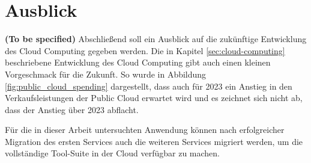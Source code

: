 \chapter{Ausblick}
\textbf{(To be specified)}
Abschließend soll ein Ausblick auf die zukünftige Entwicklung des Cloud Computing gegeben werden. Die in Kapitel \ref{sec:cloud-computing} beschriebene Entwicklung des Cloud Computing gibt auch einen kleinen Vorgeschmack für die Zukunft. So wurde in Abbildung \ref{fig:public_cloud_spending} dargestellt, dass auch für 2023 ein Anstieg in den Verkaufsleistungen der Public Cloud erwartet wird und es zeichnet sich nicht ab, dass der Anstieg über 2023 abflacht.

Für die in dieser Arbeit untersuchten Anwendung können nach erfolgreicher Migration des ersten Services auch die weiteren Services migriert werden, um die vollständige Tool-Suite in der Cloud verfügbar zu machen.
